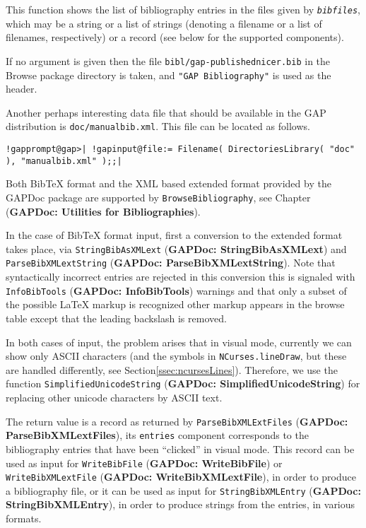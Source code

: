\documentclass[a4paper,11pt]{report}
\begin{document}
{{{ This function shows the list of bibliography entries in the files given by \mbox{\texttt{\mdseries\slshape bibfiles}}, which may be a string or a list of strings (denoting a filename or a list of
filenames, respectively) or a record (see below for the supported components). 

 If no argument is given then the file \texttt{bibl/gap-publishednicer.bib} in the \textsf{Browse} package directory is taken, and \texttt{"GAP Bibliography"} is used as the header. 

 Another perhaps interesting data file that should be available in the \textsf{GAP} distribution is \texttt{doc/manualbib.xml}. This file can be located as follows. 

 
\begin{Verbatim}[commandchars=!@|,fontsize=\small,frame=single,label=Example]
  !gapprompt@gap>| !gapinput@file:= Filename( DirectoriesLibrary( "doc" ), "manualbib.xml" );;|
\end{Verbatim}
 

 Both Bib{\TeX} format and the \textsf{XML} based extended format provided by the \textsf{GAPDoc} package are supported by \texttt{BrowseBibliography}, see Chapter{\nobreakspace} (\textbf{GAPDoc: Utilities for Bibliographies}). 

 In the case of Bib{\TeX} format input, first a conversion to the extended format takes place, via \texttt{StringBibAsXMLext} (\textbf{GAPDoc: StringBibAsXMLext}) and \texttt{ParseBibXMLextString} (\textbf{GAPDoc: ParseBibXMLextString}). Note that syntactically incorrect entries are rejected in this conversion
{\textendash}this is signaled with \texttt{InfoBibTools} (\textbf{GAPDoc: InfoBibTools}) warnings{\textendash} and that only a subset of the possible {\LaTeX} markup is recognized {\textendash}other markup appears in the browse table
except that the leading backslash is removed. 

 In both cases of input, the problem arises that in visual mode, currently we
can show only ASCII characters (and the symbols in \texttt{NCurses.lineDraw}, but these are handled differently, see Section{\nobreakspace}\ref{ssec:ncursesLines}). Therefore, we use the function \texttt{SimplifiedUnicodeString} (\textbf{GAPDoc: SimplifiedUnicodeString}) for replacing other unicode characters by ASCII text. 

 The return value is a record as returned by \texttt{ParseBibXMLExtFiles} (\textbf{GAPDoc: ParseBibXMLextFiles}), its \texttt{entries} component corresponds to the bibliography entries that have been ``clicked'' in visual mode. This record can be used as input for \texttt{WriteBibFile} (\textbf{GAPDoc: WriteBibFile}) or \texttt{WriteBibXMLextFile} (\textbf{GAPDoc: WriteBibXMLextFile}), in order to produce a bibliography file, or it can be used as input for \texttt{StringBibXMLEntry} (\textbf{GAPDoc: StringBibXMLEntry}), in order to produce strings from the entries, in various formats. 

}}}
\end{document}
